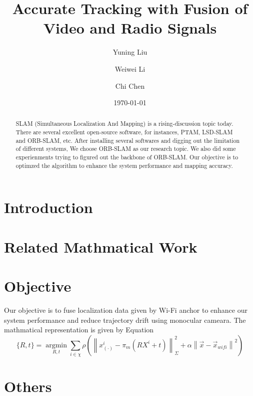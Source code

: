 \documentclass[twocolumn]{article}
\title{Accurate Tracking with Fusion of Video and Radio Signals}
\author{Yuning Liu}
\author{Weiwei Li}
\author{Chi Chen}
\affil{University of New South Wales}
\date{\today}
\begin{document}
\maketitle
\begin{abstract}
    SLAM (Simultaneous Localization And Mapping) is a rising-discussion topic today. There are several excellent open-source software, for instances, PTAM, LSD-SLAM and ORB-SLAM, etc. After installing several softwares and digging out the limitation of different systems, We choose ORB-SLAM as our research topic. We also did some experienments trying to figured out the backbone of ORB-SLAM. Our objective is to optimzed the algorithm to enhance the system performance and mapping accuracy. 
\end{abstract}

\section{Introduction}

\section{Related Mathmatical Work}

\section{Objective}

Our objective is to fuse localization data given by Wi-Fi anchor to enhance our system performance and reduce trajectory drift using monocular cameara. The mathmatical representation is given by Equation \label{wifi math}
\begin{equation}
    \{R, t\} = \operatorname*{argmin}_{R, t} \sum_{i\in \chi} \rho(\left\|x^i_{(\cdot)}-\pi_{m}(RX^i+t)\right\|^2_\Sigma+\alpha\left\|\vec{x}-\vec{x}_{wifi}\right\|^2) \label{wifi math}
\end{equation}

\section{Others}
\end{document}
